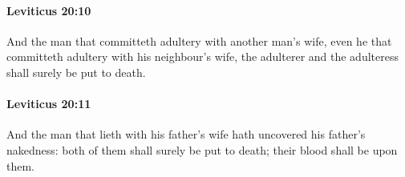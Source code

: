 		\paragraph{Leviticus 20:10} %
			\label{LEVITICUS-20-10}

			And the man that committeth adultery with another man’s wife, even he that committeth adultery with his neighbour’s wife, the adulterer and the adulteress shall surely be put to death.


		\paragraph{Leviticus 20:11} %
			\label{LEVITICUS-20-11}

			And the man that lieth with his father’s wife hath uncovered his father’s nakedness: both of them shall surely be put to death; their blood shall be upon them.



